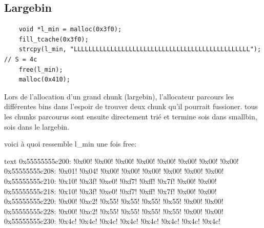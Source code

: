 \subsection{Largebin}
\begin{verbatim}
    void *l_min = malloc(0x3f0);
    fill_tcache(0x3f0);
    strcpy(l_min, "LLLLLLLLLLLLLLLLLLLLLLLLLLLLLLLLLLLLLLLLLLLLLLLL"); // S = 4c
    free(l_min);
    malloc(0x410);
\end{verbatim}

Lors de l'allocation d'un grand chunk (largebin), l'allocateur parcours les différentes bins dans
l'espoir de trouver deux chunk qu'il pourrait fussioner.
tous les chunks parcourus sont ensuite directement trié et termine sois dans smallbin, sois dans
le largebin.

voici à quoi ressemble l\_min une fois free:

\begin{pwndbg}[x/56bx l\_min - 0x10]{text}
      0x55555555c200: !\textcolor{pwndbgbrown}{0x00}! !\textcolor{pwndbgbrown}{0x00}! !\textcolor{pwndbgbrown}{0x00}! !\textcolor{pwndbgbrown}{0x00}! !\textcolor{pwndbgbrown}{0x00}! !\textcolor{pwndbgbrown}{0x00}! !\textcolor{pwndbgbrown}{0x00}! !\textcolor{pwndbgbrown}{0x00}!
      0x55555555c208: !\textcolor{pwndbgred}{0x01}! !\textcolor{pwndbgred}{0x04}! !\textcolor{pwndbgred}{0x00}! !\textcolor{pwndbgred}{0x00}! !\textcolor{pwndbgred}{0x00}! !\textcolor{pwndbgred}{0x00}! !\textcolor{pwndbgred}{0x00}! !\textcolor{pwndbgred}{0x00}!
      0x55555555c210: !\textcolor{pwndbgblue}{0x10}! !\textcolor{pwndbgblue}{0x3f}! !\textcolor{pwndbgblue}{0xe0}! !\textcolor{pwndbgblue}{0xf7}! !\textcolor{pwndbgblue}{0xff}! !\textcolor{pwndbgblue}{0x7f}! !\textcolor{pwndbgblue}{0x00}! !\textcolor{pwndbgblue}{0x00}!
      0x55555555c218: !\textcolor{pwndbgyellow}{0x10}! !\textcolor{pwndbgyellow}{0x3f}! !\textcolor{pwndbgyellow}{0xe0}! !\textcolor{pwndbgyellow}{0xf7}! !\textcolor{pwndbgyellow}{0xff}! !\textcolor{pwndbgyellow}{0x7f}! !\textcolor{pwndbgyellow}{0x00}! !\textcolor{pwndbgyellow}{0x00}!
      0x55555555c220: !\textcolor{pwndbgpurple}{0x00}! !\textcolor{pwndbgpurple}{0xc2}! !\textcolor{pwndbgpurple}{0x55}! !\textcolor{pwndbgpurple}{0x55}! !\textcolor{pwndbgpurple}{0x55}! !\textcolor{pwndbgpurple}{0x55}! !\textcolor{pwndbgpurple}{0x00}! !\textcolor{pwndbgpurple}{0x00}!
      0x55555555c228: !\textcolor{pwndbgorange}{0x00}! !\textcolor{pwndbgorange}{0xc2}! !\textcolor{pwndbgorange}{0x55}! !\textcolor{pwndbgorange}{0x55}! !\textcolor{pwndbgorange}{0x55}! !\textcolor{pwndbgorange}{0x55}! !\textcolor{pwndbgorange}{0x00}! !\textcolor{pwndbgorange}{0x00}!
      0x55555555c230: !\textcolor{pwndbgdarkgreen}{0x4c}! !\textcolor{pwndbgdarkgreen}{0x4c}! !\textcolor{pwndbgdarkgreen}{0x4c}! !\textcolor{pwndbgdarkgreen}{0x4c}! !\textcolor{pwndbgdarkgreen}{0x4c}! !\textcolor{pwndbgdarkgreen}{0x4c}! !\textcolor{pwndbgdarkgreen}{0x4c}! !\textcolor{pwndbgdarkgreen}{0x4c}!
\end{pwndbg}

